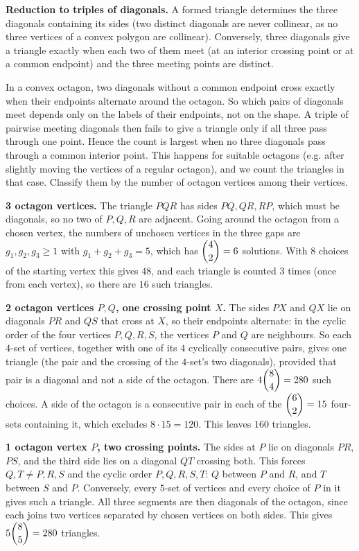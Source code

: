 \textbf{Reduction to triples of diagonals.} A formed triangle determines the three diagonals containing its sides (two distinct diagonals are never collinear, as no three vertices of a convex polygon are collinear). Conversely, three diagonals give a triangle exactly when each two of them meet (at an interior crossing point or at a common endpoint) and the three meeting points are distinct.

In a convex octagon, two diagonals without a common endpoint cross exactly when their endpoints alternate around the octagon. So which pairs of diagonals meet depends only on the labels of their endpoints, not on the shape. A triple of pairwise meeting diagonals then fails to give a triangle only if all three pass through one point. Hence the count is largest when no three diagonals pass through a common interior point. This happens for suitable octagons (e.g. after slightly moving the vertices of a regular octagon), and we count the triangles in that case. Classify them by the number of octagon vertices among their vertices.

\textbf{3 octagon vertices.} The triangle $PQR$ has sides $PQ,QR,RP$, which must be diagonals, so no two of $P,Q,R$ are adjacent. Going around the octagon from a chosen vertex, the numbers of unchosen vertices in the three gaps are $g_1,g_2,g_3\ge1$ with $g_1+g_2+g_3=5$, which has $\dbinom42=6$ solutions. With $8$ choices of the starting vertex this gives $48$, and each triangle is counted $3$ times (once from each vertex), so there are $16$ such triangles.

\textbf{2 octagon vertices $P,Q$, one crossing point $X$.} The sides $PX$ and $QX$ lie on diagonals $PR$ and $QS$ that cross at $X$, so their endpoints alternate: in the cyclic order of the four vertices $P,Q,R,S$, the vertices $P$ and $Q$ are neighbours. So each $4$-set of vertices, together with one of its $4$ cyclically consecutive pairs, gives one triangle (the pair and the crossing of the $4$-set's two diagonals), provided that pair is a diagonal and not a side of the octagon. There are $4\dbinom84=280$ such choices. A side of the octagon is a consecutive pair in each of the $\dbinom62=15$ four-sets containing it, which excludes $8\cdot15=120$. This leaves $160$ triangles.

\textbf{1 octagon vertex $P$, two crossing points.} The sides at $P$ lie on diagonals $PR$, $PS$, and the third side lies on a diagonal $QT$ crossing both. This forces $Q,T\ne P,R,S$ and the cyclic order $P,Q,R,S,T$: $Q$ between $P$ and $R$, and $T$ between $S$ and $P$. Conversely, every $5$-set of vertices and every choice of $P$ in it gives such a triangle. All three segments are then diagonals of the octagon, since each joins two vertices separated by chosen vertices on both sides. This gives $5\dbinom85=280$ triangles.


